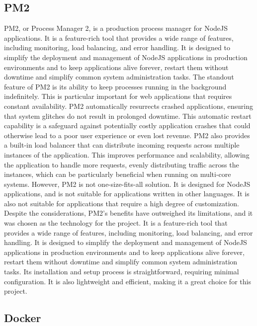 \subsection{PM2}
PM2, or Process Manager 2, is a production process manager for NodeJS applications. It is a feature-rich tool that provides a wide range of features, including monitoring, load balancing, and error handling. It is designed to simplify the deployment and management of NodeJS applications in production environments and to keep applications alive forever, restart
them without downtime and simplify common system administration tasks.
The standout feature of PM2 is its ability to keep processes running in the background indefinitely. This is particular important for web applications that requires constant availability. PM2 automatically resurrects crashed applications, ensuring that system glitches do not result in prolonged downtime.\cite{pm2}
This automatic restart capability is a safeguard against potentially costly application crashes that could otherwise lead to a poor user experience or even lost revenue. \cite{pm2}
PM2 also provides a built-in load balancer that can distribute incoming requests across multiple instances of the application. This improves performance and scalability, allowing the application to handle more requests, evenly distributing traffic across the instances, which can be particularly beneficial when running on multi-core systems. \cite{pm2LoadBalancing}
However, PM2 is not one-size-fits-all solution. It is designed for NodeJS applications, and is not suitable for applications written in other languages. It is also not suitable for applications that require a high degree of customization. \cite{pm2}
Despite the considerations, PM2's benefits have outweighed its limitations, and it was chosen as the technology for the project. It is a feature-rich tool that provides a wide range of features, including monitoring, load balancing, and error handling. 
It is designed to simplify the deployment and management of NodeJS applications in production environments and to keep applications alive forever, restart them without downtime and simplify common system administration tasks. 
Its installation and setup process is straightforward, requiring minimal configuration. It is also lightweight and efficient, making it a great choice for this project. \cite{tilkov}

\subsection{Docker}

